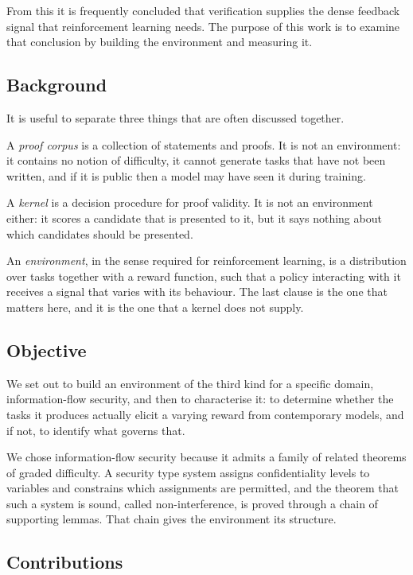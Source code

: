 \documentclass[11pt]{article}
\begin{document}
From this it is frequently concluded that verification supplies the dense
feedback signal that reinforcement learning needs. The purpose of this work is
to examine that conclusion by building the environment and measuring it.

\subsection{Background}

It is useful to separate three things that are often discussed together.

A \emph{proof corpus} is a collection of statements and proofs. It is not an
environment: it contains no notion of difficulty, it cannot generate tasks that
have not been written, and if it is public then a model may have seen it during
training.

A \emph{kernel} is a decision procedure for proof validity. It is not an
environment either: it scores a candidate that is presented to it, but it says
nothing about which candidates should be presented.

An \emph{environment}, in the sense required for reinforcement learning, is a
distribution over tasks together with a reward function, such that a policy
interacting with it receives a signal that varies with its behaviour. The last
clause is the one that matters here, and it is the one that a kernel does not
supply.

\subsection{Objective}

We set out to build an environment of the third kind for a specific domain,
information-flow security, and then to characterise it: to determine whether the
tasks it produces actually elicit a varying reward from contemporary models, and
if not, to identify what governs that.

We chose information-flow security because it admits a family of related
theorems of graded difficulty. A security type system assigns confidentiality
levels to variables and constrains which assignments are permitted, and the
theorem that such a system is sound, called non-interference, is proved through a
chain of supporting lemmas. That chain gives the environment its structure.

\subsection{Contributions}
\end{document}
